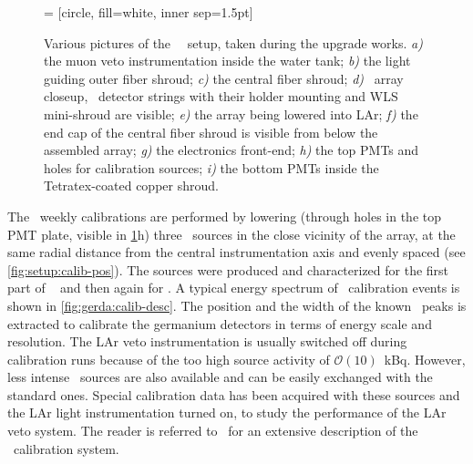 \begin{figure}
   = [circle, fill=white, inner sep=1.5pt]
  \caption{%
    Various pictures of the \gerda\ \phasetwo\ setup, taken during the upgrade works.
    \emph{a)} the muon veto instrumentation inside the water tank; \emph{b)} the light
    guiding outer fiber shroud; \emph{c)} the central fiber shroud; \emph{d)} \phasetwo\
    array closeup, \bege\ detector strings with their holder mounting and WLS mini-shroud
    are visible; \emph{e)} the array being lowered into LAr; \emph{f)} the end cap of the
    central fiber shroud is visible from below the assembled array; \emph{g)} the
    electronics front-end; \emph{h)} the top PMTs and holes for calibration sources;
    \emph{i)} the bottom PMTs inside the Tetratex\reg-coated copper shroud.
  }\label{fig:setup:pictures}
\end{figure}

The \gerda\ weekly calibrations are performed by lowering (through holes in the top PMT
plate, visible in \cref{fig:setup:pictures}h) three \Th\ sources in the close vicinity of
the array, at the same radial distance from the central instrumentation axis and evenly
spaced (see \cref{fig:setup:calib-pos}). The sources were produced and characterized for the
first part of \phasetwo~\cite{Baudis2015} and then again for \phasetwop. A typical energy
spectrum of \Th\ calibration events is shown in \cref{fig:gerda:calib-desc}. The position
and the width of the known \g\ peaks is extracted to calibrate the germanium detectors in
terms of energy scale and resolution. The LAr veto instrumentation is usually switched off
during calibration runs because of the too high source activity of $\mathcal{O}(10)$~kBq.
However, less intense \Ra\ sources are also available and can be easily exchanged with the
standard ones. Special calibration data has been acquired with these sources and the LAr
light instrumentation turned on, to study the performance of the LAr veto system. The
reader is referred to~\cite{Mingazheva2019, Miloradovic2020, Agostini2021c} for an extensive
description of the \gerda\ calibration system.

